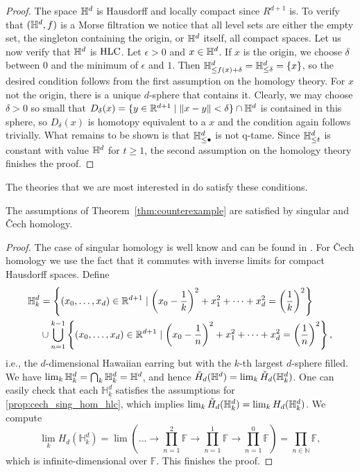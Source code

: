 \begin{proof}
	The space $\mathbb{H}^d$ is Hausdorff and locally compact since $R^{d+1}$ is.
	To verify that $(\mathbb{H}^d,f)$ is a Morse filtration we notice that all level sets are either the empty set, the singleton containing the origin, or $\mathbb{H}^d$ itself, all compact spaces.
	Let us now verify that $\mathbb{H}^d$ is $\mathrm{HLC}$.
	Let $\epsilon > 0$ and $x \in \mathbb{H}^d$.
	If $x$ is the origin, we choose $\delta$ between $0$ and the minimum of $\epsilon$ and $1$.
	Then $\mathbb{H}^d_{\leq f(x) + \delta} = \mathbb{H}^d_{\leq \delta} = \{x\}$, so the desired condition follows from the first assumption on the homology theory.
	For $x$ not the origin, there is a unique $d$-sphere that contains it.
	Clearly, we may choose $\delta > 0$ so small that $D_\delta(x) = \{y \in \mathbb{R}^{d+1} \mid \Vert x - y \Vert < \delta\} \cap \mathbb{H}^d$ is contained in this sphere, so $D_\delta(x)$ is homotopy equivalent to a $x$ and the condition again follows trivially.
	What remains to be shown is that $\mathbb{H}^d_{\leq \bullet}$ is not q-tame.
	Since $\mathbb{H}^d_{\leq t}$ is constant with value $\mathbb{H}^d$ for $t \geq 1$, the second assumption on the homology theory finishes the proof.
\end{proof}

The theories that we are most interested in do satisfy these conditions.

\begin{prop}
	The assumptions of Theorem~\ref{thm:counterexample} are satisfied by singular and \v{Cech} homology.
\end{prop}

\begin{proof}
	The case of singular homology is well know and can be found in \cite{Barratt.1962}.
	For \v{C}ech homology we use the fact that it commutes with inverse limits for compact Hausdorff spaces.
	Define 
	\begin{align*}
	\mathbb{H}^d_k &= \left\{(x_0,\dots,x_d)\in\mathbb{R}^{d+1}\mid \left(x_0-\frac{1}{k}\right)^2+x_1^2+\dots+x_d^2=\left(\frac{1}{k}\right)^2\right\}\\
	&\cup\bigcup_{n=1}^{k-1}\left\{(x_0,\dots,x_d)\in\mathbb{R}^{d+1}\mid \left(x_0-\frac{1}{n}\right)^2+x_1^2+\dots+x_d^2=\left(\frac{1}{n}\right)^2\right\},
	\end{align*}
	i.e., the $d$-dimensional Hawaiian earring but with the $k$-th largest $d$-sphere filled.
	We have $\lim_{k}\mathbb{H}^d_{k} = \bigcap_{k}\mathbb{H}^{d}_{k}=\mathbb{H}^{d}$, and hence $\check{H}_{d}(\mathbb{H}^d) = \lim_{k}\check{H}_{d}(\mathbb{H}^{d}_{k})$.
	One can easily check that each $\mathbb{H}^{d}_{k}$ satisfies the assumptions for \cref{prop:cech_sing_hom_hlc}, which implies $\lim_{k}\check{H}_{d}(\mathbb{H}^{d}_{k})=\lim_{k}H_{d}(\mathbb{H}^{d}_{k})$.
	We compute
	\begin{equation*}
	\lim_{k}H_{d}(\mathbb{H}^{d}_{k})=\lim\left(\dots\to \prod_{n=1}^2\mathbb{F}\to \prod_{n=1}^1\mathbb{F}\to \prod_{n=1}^0\mathbb{F}\right)=\prod_{n\in\mathbb{N}}\mathbb{F},
	\end{equation*}
	which is infinite-dimensional over $\mathbb{F}$.
	This finishes the proof.
\end{proof}

